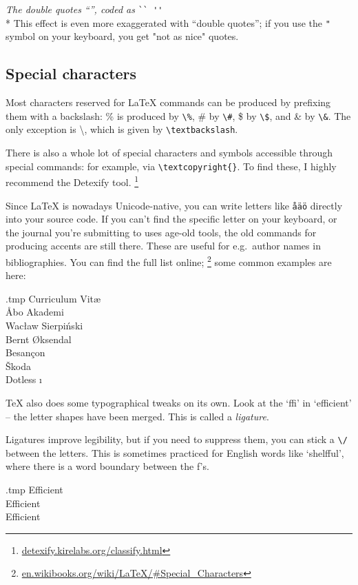 \medskip\noindent\emph{The double quotes ``'', coded as} \verb|`` ''|\\*
This effect is even more exaggerated with ``double quotes'';
if you use the \verb|"| symbol on your keyboard,
you get "not as nice" quotes.



%
%
\subsection{Special characters}

Most characters reserved for \LaTeX{} commands can be produced by prefixing them with a backslash:
\% is produced by \verb|\%|, \# by \verb|\#|, \$ by \verb|\$|, and \& by \verb|\&|.
The only exception is \textbackslash, which is given by \verb|\textbackslash|.

There is also a whole lot of special characters and symbols accessible
through special commands: for example, \textcopyright{} via \verb|\textcopyright{}|.
To find these, I highly recommend the Detexify tool.%
\footnote{\url{detexify.kirelabs.org/classify.html}}

\bigskip\noindent%
Since \LaTeX{} is nowadays Unicode-native,
you can write letters like \verb|åäö| directly into your source code.
If you can't find the specific letter on your keyboard,
or the journal you're submitting to uses age-old tools,
the old commands for producing accents are still there.
These are useful for e.g.\ author names in bibliographies.
You can find the full list online;%
\footnote{\url{en.wikibooks.org/wiki/LaTeX/\#Special_Characters}}
some common examples are here:
%
\begin{VerbatimOut}{\jobname.tmp}
Curriculum Vit\ae\\
\r{A}bo Akademi\\
Wac\l{}aw Sierpi\'{n}ski\\
Bernt \O{}ksendal\\
Besan\c{c}on\\
\v{S}koda\\
Dotless \i
\end{VerbatimOut}
\ShowExample


\TeX{} also does some typographical tweaks on its own.
Look at the `ffi' in `efficient' -- the letter shapes have been merged.
This is called a \emph{ligature}.

Ligatures improve legibility, but if you need to suppress them,
you can stick a \verb|\/| between the letters.
This is sometimes practiced for English words like `shelf\/ful',
where there is a word boundary between the f's.
%
\begin{VerbatimOut}{\jobname.tmp}
Efficient\\
Ef\/ficient\\
Ef\/f\/icient
\end{VerbatimOut}
\ShowExample


